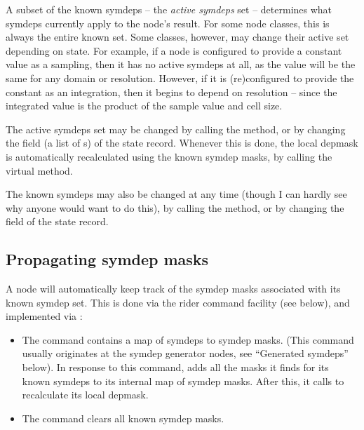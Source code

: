   A subset of the known symdeps -- the {\em active symdeps} set -- determines
  what symdeps currently apply to the node's result. For some node classes,
  this is always the entire known set. Some classes, however, may change their
  active set depending on state. For example, if a  node is
  configured to provide a constant value as a sampling, then it has no active
  symdeps at all, as the value will be the same for any domain or resolution.
  However, if it is (re)configured to provide the constant as an integration,
  then it begins to depend on resolution -- since the integrated value is the
  product of the sample value and cell size.

  The active symdeps set may be changed by calling the 
  method, or by changing the  field (a list of s)
  of the state record. Whenever this is done, the local depmask is
  automatically recalculated using the known symdep masks, by calling the
  virtual  method.

  The known symdeps may also be changed at any time (though I can hardly see
  why anyone would want to do this), by calling the 
  method, or by changing the   field of the state record. 
  
\subsection{Propagating symdep masks}

  A node will automatically keep track of the symdep masks associated with its
  known symdep set. This is done via the rider command facility (see below),
  and implemented via :

  \begin{itemize}
  
  \item The  command contains a map of symdeps to symdep
    masks. (This command usually originates at the symdep generator nodes, see
    ``Generated symdeps'' below). In response to this command,  adds
    all the masks it finds for its known symdeps to its internal map of symdep
    masks. After this, it calls  to recalculate its
    local depmask. 

  \item The  command clears all known symdep masks.
  
  \end{itemize}
  

